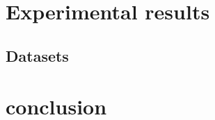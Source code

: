 \documentclass[journal,sort]{IEEEtran}
\begin{document}
\section{Experimental results}
\subsection{Datasets}
\section{conclusion}




	
	
	
	
	
	
	
\end{document}
